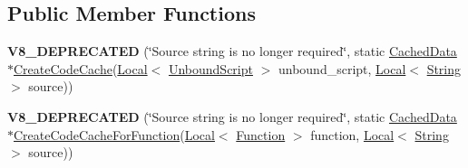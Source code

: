 \subsection*{Public Member Functions}
\begin{DoxyCompactItemize}
\item 
\mbox{\label{classv8_1_1ScriptCompiler_acde1fbea8253cfcfc0f9139162b3a24a}} 
{\bfseries V8\+\_\+\+D\+E\+P\+R\+E\+C\+A\+T\+ED} (\char`\"{}Source string is no longer required\char`\"{}, static \mbox{\hyperlink{structv8_1_1ScriptCompiler_1_1CachedData}{Cached\+Data}} $\ast$\mbox{\hyperlink{classv8_1_1ScriptCompiler_a3083edf7f887a38f1024d11c0dd7ccdb}{Create\+Code\+Cache}}(\mbox{\hyperlink{classv8_1_1Local}{Local}}$<$ \mbox{\hyperlink{classv8_1_1UnboundScript}{Unbound\+Script}} $>$ unbound\+\_\+script, \mbox{\hyperlink{classv8_1_1Local}{Local}}$<$ \mbox{\hyperlink{classv8_1_1String}{String}} $>$ source))
\item 
\mbox{\label{classv8_1_1ScriptCompiler_ac4d49e3d704a153232fc6d9bdc3b9ea9}} 
{\bfseries V8\+\_\+\+D\+E\+P\+R\+E\+C\+A\+T\+ED} (\char`\"{}Source string is no longer required\char`\"{}, static \mbox{\hyperlink{structv8_1_1ScriptCompiler_1_1CachedData}{Cached\+Data}} $\ast$\mbox{\hyperlink{classv8_1_1ScriptCompiler_a558a38d3be1394c153dc45e1eb059aa7}{Create\+Code\+Cache\+For\+Function}}(\mbox{\hyperlink{classv8_1_1Local}{Local}}$<$ \mbox{\hyperlink{classv8_1_1Function}{Function}} $>$ function, \mbox{\hyperlink{classv8_1_1Local}{Local}}$<$ \mbox{\hyperlink{classv8_1_1String}{String}} $>$ source))
\end{DoxyCompactItemize}
